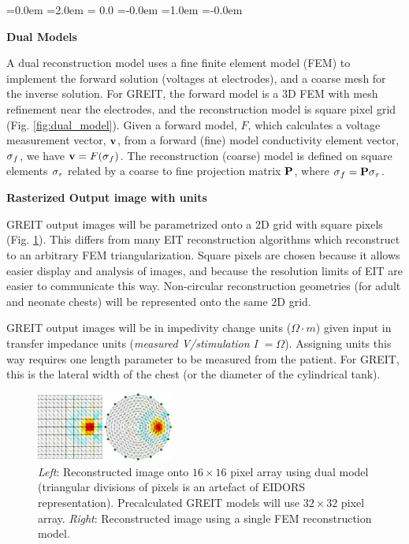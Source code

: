 \documentclass[letterpaper,twocolumn,10pt]{article}
\newcommand{\vB}{\mbox{$\bf v$}}
\newcommand{\PB}{\mbox{$\bf P$}}
\newcommand{\sG}{\mbox{$\bf \sigma$}}
\begin{document}
\begin{list}{\bf {}.}
  {\leftmargin=0.0em \itemindent=2.0em
    \topsep= 0.0\baselineskip
    \itemsep=-0.0em
    \listparindent=1.0em \parsep=-0.0em
    }

\item {\bf Dual Models}

A dual reconstruction model uses a fine finite element
model (FEM) to implement the forward solution (voltages
at electrodes), and a coarse mesh for the inverse
solution. For GREIT, the forward model is a 3D FEM with
mesh refinement near the electrodes, and the reconstruction
model is square pixel grid (Fig. \ref{fig:dual_model}).
Given a forward model, $F$,
which calculates a voltage measurement vector, $\vB$, from
a forward (fine) model conductivity element vector, $\sG_f$, we
have $\vB = F( \sG_f )$. The reconstruction (coarse)
model is defined on square elements $\sG_r$ related by
a coarse to fine projection matrix $\PB$, where $\sG_f = \PB \sG_r$.

\item {\bf Rasterized Output image with units}

GREIT output images will be parametrized onto
a 2D grid with square pixels (Fig. \ref{fig:square_pixels}).
This differs from many EIT reconstruction algorithms
which reconstruct to an arbitrary FEM triangularization.
Square pixels are chosen because it allows easier
display and analysis of images, and because the 
resolution limits of EIT are easier to communicate this way.
Non-circular reconstruction geometries (for adult and
neonate chests) will be represented onto the same 2D grid.

GREIT output images will be in impedivity change units
($\Omega\cdot m$) given input in transfer impedance units
({\em measured V/stimulation I} $=\Omega$). Assigning units
this way requires one length parameter to be measured
from the patient. For GREIT, this is the lateral width of
the chest (or the diameter of the cylindrical tank).

\begin{figure}[tbh]
\begin{center}
 \includegraphics[width= 0.4\textwidth, bb=0 0 749 378]{figs/square_mesh06a.png}
\caption{ \label{fig:square_pixels}
\small
{\em Left}: Reconstructed image onto $16\times 16$ pixel array using
dual model (triangular divisions of pixels is an artefact of EIDORS
representation). Precalculated GREIT models
will use $32\times 32$ pixel array.
{\em Right}: Reconstructed image using a single FEM reconstruction model.
}
\end{center}
\end{figure}


\end{list}
\end{document}

